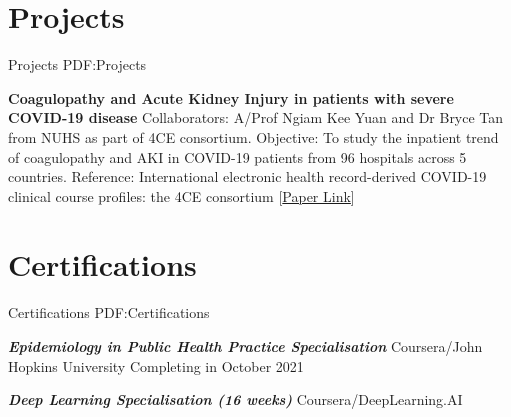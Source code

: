 \documentclass[letterpaper,10pt,oneside]{article}
\begin{document}
\begin{body}
\section
{Projects}
{Projects}
{PDF:Projects}

\textbf{Coagulopathy and Acute Kidney Injury in patients with severe COVID-19 disease}
\BulletItem Collaborators: A/Prof Ngiam Kee Yuan and Dr Bryce Tan from NUHS as part of 4CE consortium.
\BulletItem Objective: To study the inpatient trend of coagulopathy and AKI in COVID-19 patients from 96 hospitals across 5 countries.
\BulletItem Reference: International electronic health record-derived COVID-19 clinical course profiles: the 4CE consortium [\href{https://www.nature.com/articles/s41746-020-00308-0}{Paper Link}]
\GapNoBreak





\section
{Certifications}
{Certifications}
{PDF:Certifications}

\textbf{\textit{Epidemiology in Public Health Practice Specialisation}} Coursera/John Hopkins University 
\hfill
{}
\BulletItem
Completing in October 2021

\textbf{\textit{Deep Learning Specialisation (16 weeks)}} Coursera/DeepLearning.AI 
\hfill
{}


\end{body}
\end{document}
